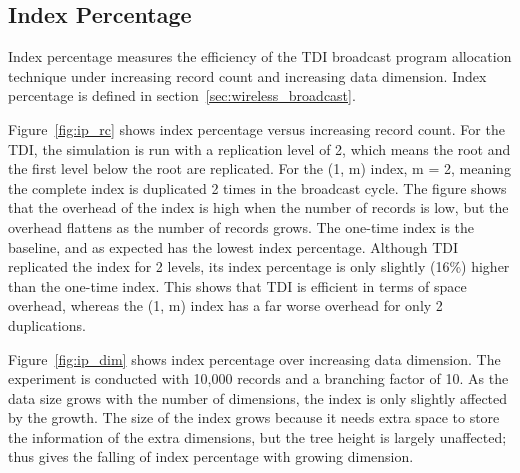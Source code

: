 \subsection{Index Percentage}

Index percentage measures the efficiency of the TDI broadcast program
allocation technique under increasing record count and increasing data
dimension. Index percentage is defined in
section~\ref{sec:wireless_broadcast}.

Figure~\ref{fig:ip_rc} shows index percentage versus increasing
record count. For the TDI, the simulation is run with a
replication level of 2, which means the root and the first level
below the root are replicated. For the (1, m) index, m = 2,
meaning the complete index is duplicated 2 times in the broadcast
cycle. The figure shows that the overhead of the index is high
when the number of records is low, but the overhead flattens as
the number of records grows. The one-time index is the baseline,
and as expected has the lowest index percentage. Although TDI
replicated the index for 2 levels, its index percentage is only
slightly (16\%) higher than the one-time index. This shows that
TDI is efficient in terms of space overhead, whereas the (1, m)
index has a far worse overhead for only 2 duplications.

Figure~\ref{fig:ip_dim} shows index percentage over increasing
data dimension. The experiment is conducted with 10,000 records
and a branching factor of 10. As the data size grows with the
number of dimensions, the index is only slightly affected by the
growth. The size of the index grows because it needs extra space
to store the information of the extra dimensions, but the tree
height is largely unaffected; thus gives the falling of index
percentage with growing dimension.


